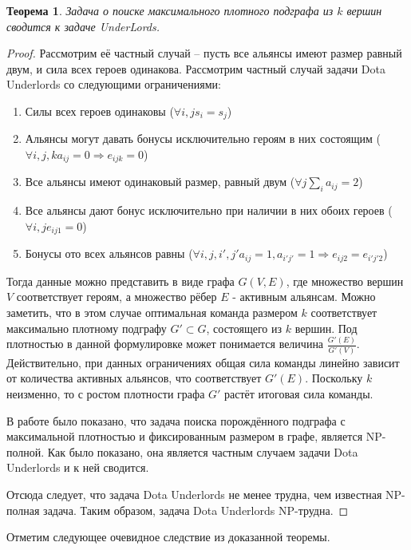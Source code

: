 \documentclass{article}
\newtheorem{theorem}{Теорема}
\begin{document}
\begin{theorem}
\label{MEWC_DU}
Задача о поиске максимального плотного подграфа из $k$ вершин сводится к задаче UnderLords.
\end{theorem}
\begin{proof}
Рассмотрим её частный случай -- пусть все альянсы имеют размер равный двум, и сила всех героев одинакова. Рассмотрим частный случай задачи Dota Underlords со следующими ограничениями:

\begin{enumerate}
    \item Силы всех героев одинаковы ($\forall i, j s_i=s_j$)
    \item Альянсы могут давать бонусы исключительно героям в них состоящим ($\forall i, j, k a_{ij}=0 \Longrightarrow e_{ijk} = 0$)
    \item Все альянсы имеют одинаковый размер, равный двум ($\forall j \sum_i a_{ij}=2$)
    \item Все альянсы дают бонус исключительно при наличии в них обоих героев ($\forall i, j e_{ij1}=0$)
    \item Бонусы ото всех альянсов равны ($\forall i, j, i', j' a_{ij}=1, a_{i' j'}=1 \Longrightarrow e_{ij2}=e_{i' j' 2}$)
\end{enumerate}

Тогда данные можно представить в виде графа $G(V, E)$, где множество вершин $V$ соответствует героям, а множество рёбер $E$ - активным альянсам. Можно заметить, что в этом случае оптимальная команда размером $k$ соответствует максимально плотному подграфу $G' \subset G$, состоящего из $k$ вершин. Под плотностью в данной формулировке может понимается величина $\frac{G'(E)}{G'(V)}$. Действительно, при данных ограничениях общая сила команды линейно зависит от количества активных альянсов, что соответствует $G'(E)$. Поскольку $k$ неизменно, то с ростом плотности графа $G'$ растёт итоговая сила команды.

В работе \cite{downey1995fixed} было показано, что задача поиска порождённого подграфа с максимальной плотностью и фиксированным размером в графе, является NP-полной. Как было показано, она является частным случаем задачи Dota Underlords и к ней сводится. 

Отсюда следует, что задача Dota  Underlords не менее трудна, чем известная NP-полная задача. Таким образом,  задача Dota  Underlords NP-трудна.
\end{proof}

Отметим следующее очевидное следствие из доказанной теоремы.
\end{document}
